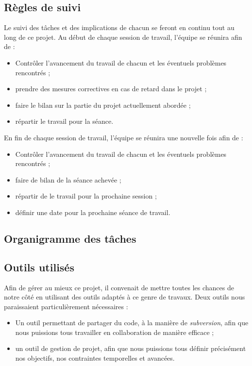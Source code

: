 \subsection{Règles de suivi}
Le suivi des tâches et des implications de chacun se feront en continu tout au long de ce projet. Au début de chaque session de travail, l'équipe se réunira afin de :
\begin{itemize}
  \item Contrôler l'avancement du travail de chacun et les éventuels problèmes rencontrés ;
  \item prendre des mesures correctives en cas de retard dans le projet ;
  \item faire le bilan sur la partie du projet actuellement abordée ;
  \item répartir le travail pour la séance.
\end{itemize}
En fin de chaque session de travail, l'équipe se réunira une nouvelle fois afin de :
\begin{itemize}
  \item Contrôler l'avancement du travail de chacun et les éventuels problèmes rencontrés ;
  \item faire de bilan de la séance achevée ;
  \item répartir de le travail pour la prochaine session ;
  \item définir une date pour la prochaine séance de travail.
\end{itemize}

\subsection{Organigramme des tâches}

\subsection{Outils utilisés}
Afin de gérer au mieux ce projet, il convenait de mettre toutes les chances de notre côté en utilisant des outils adaptés à ce genre de travaux. Deux outils nous paraissaient particulièrement nécessaires :
\begin{itemize}
  \item Un outil permettant de partager du code, à la manière de \textit{subversion}, afin que nous puissions tous travailler en collaboration de manière efficace ;
  \item un outil de gestion de projet, afin que nous puissions tous définir précisément nos objectifs, nos contraintes temporelles et avancées.
\end{itemize}

